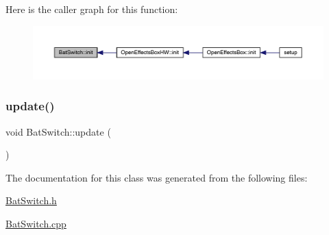 Here is the caller graph for this function\+:\nopagebreak
\begin{figure}[H]
\begin{center}
\leavevmode
\includegraphics[width=350pt]{class_bat_switch_a144b8789518472a4d5dc19f09968148e_icgraph}
\end{center}
\end{figure}
\mbox{\label{class_bat_switch_ac22ba354f82cc1c0e2e8d6876305ea66}} 
\subsubsection{\texorpdfstring{update()}{update()}}
{\footnotesize\ttfamily void Bat\+Switch\+::update (\begin{DoxyParamCaption}{ }\end{DoxyParamCaption})}



The documentation for this class was generated from the following files\+:\begin{DoxyCompactItemize}
\item 
\mbox{\hyperlink{_bat_switch_8h}{Bat\+Switch.\+h}}\item 
\mbox{\hyperlink{_bat_switch_8cpp}{Bat\+Switch.\+cpp}}\end{DoxyCompactItemize}

